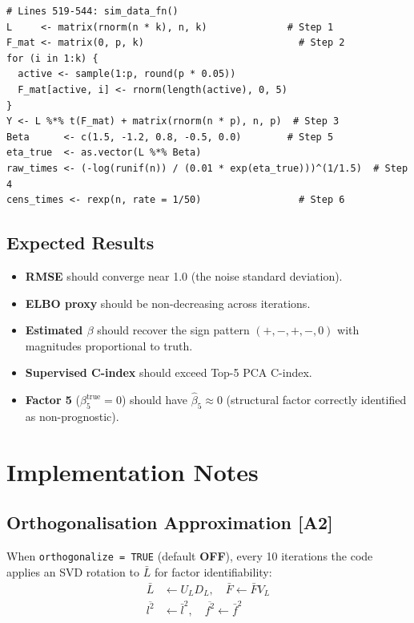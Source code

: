 \documentclass[11pt]{article}
\newcommand{\lbar}[2]{\bar{l}_{#1#2}}
\newcommand{\fbar}[2]{\bar{f}_{#1#2}}
\newcommand{\lsec}[2]{\overline{l^2_{#1#2}}}
\newcommand{\fsec}[2]{\overline{f^2_{#1#2}}}
\newcommand{\coderef}[1]{{\color{blue!70!black}\texttt{#1}}}
\begin{document}
\begin{codebox}
\begin{lstlisting}[style=Rstyle]
# Lines 519-544: sim_data_fn()
L     <- matrix(rnorm(n * k), n, k)              # Step 1
F_mat <- matrix(0, p, k)                           # Step 2
for (i in 1:k) {
  active <- sample(1:p, round(p * 0.05))
  F_mat[active, i] <- rnorm(length(active), 0, 5)
}
Y <- L %*% t(F_mat) + matrix(rnorm(n * p), n, p)  # Step 3
Beta      <- c(1.5, -1.2, 0.8, -0.5, 0.0)        # Step 5
eta_true  <- as.vector(L %*% Beta)
raw_times <- (-log(runif(n)) / (0.01 * exp(eta_true)))^(1/1.5)  # Step 4
cens_times <- rexp(n, rate = 1/50)                 # Step 6
\end{lstlisting}
\end{codebox}

\subsection{Expected Results}

\begin{itemize}[noitemsep]
\item \textbf{RMSE} should converge near 1.0 (the noise standard deviation).
\item \textbf{ELBO proxy} should be non-decreasing across iterations.
\item \textbf{Estimated $\beta$} should recover the sign pattern
      $(+, -, +, -, 0)$ with magnitudes proportional to truth.
\item \textbf{Supervised C-index} should exceed Top-5 PCA C-index.
\item \textbf{Factor 5} ($\beta^{\text{true}}_5 = 0$) should have
      $\hat{\beta}_5 \approx 0$ (structural factor correctly identified as
      non-prognostic).
\end{itemize}

\section{Implementation Notes}\label{sec:impl-notes}

\subsection{Orthogonalisation Approximation [A2]}

When \coderef{orthogonalize = TRUE} (default \textbf{OFF}), every 10
iterations the code applies an SVD rotation to $\bar{L}$ for factor
identifiability:
\begin{align*}
  \bar{L} &\leftarrow U_L D_L, \quad \bar{F} \leftarrow \bar{F} V_L \\
  \lsec{}{} &\leftarrow \lbar{}{}^2, \quad \fsec{}{} \leftarrow \fbar{}{}^2
\end{align*}
\end{document}
